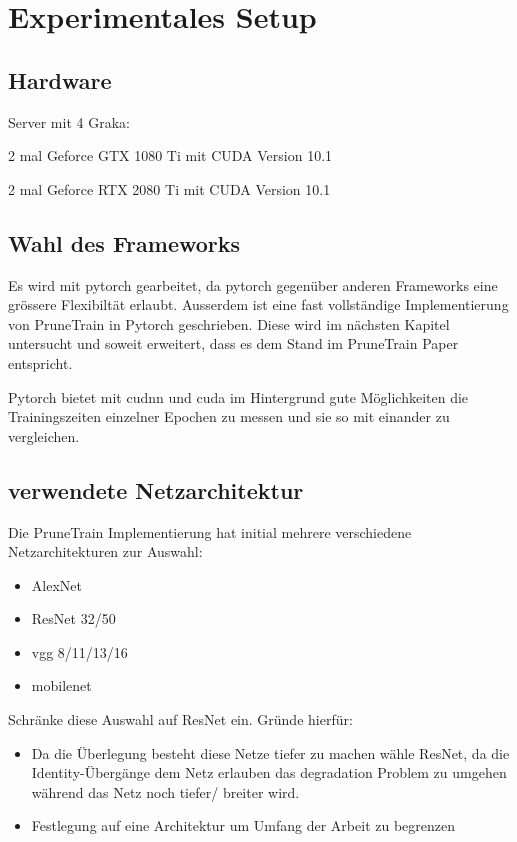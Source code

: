 \section{Experimentales Setup}


\subsection{Hardware}
Server mit 4 Graka:

2 mal Geforce GTX 1080 Ti mit CUDA Version 10.1 

2 mal Geforce RTX 2080 Ti mit CUDA Version 10.1

\subsection{Wahl des Frameworks}

Es wird mit pytorch gearbeitet, da pytorch gegenüber anderen Frameworks eine grössere Flexibiltät erlaubt. Ausserdem ist eine fast vollständige Implementierung von PruneTrain in Pytorch geschrieben. Diese wird im nächsten Kapitel untersucht und soweit erweitert, dass es dem Stand im PruneTrain Paper entspricht.

Pytorch bietet mit cudnn und cuda im Hintergrund gute Möglichkeiten die Trainingszeiten einzelner Epochen zu messen und sie so mit einander zu vergleichen.


\subsection{verwendete Netzarchitektur}\label{sec:archi}
Die PruneTrain Implementierung hat initial mehrere verschiedene Netzarchitekturen zur Auswahl:
\begin{itemize}
 \item AlexNet
 \item ResNet 32/50
 \item vgg 8/11/13/16
 \item mobilenet
\end{itemize}

Schränke diese Auswahl auf ResNet ein.
Gründe hierfür:
\begin{itemize}
 \item Da die Überlegung besteht diese Netze tiefer zu machen wähle ResNet, da die Identity-Übergänge dem Netz erlauben das degradation Problem zu umgehen während das Netz noch tiefer/ breiter wird.
 \item Festlegung auf eine Architektur um Umfang der Arbeit zu begrenzen
\end{itemize}

